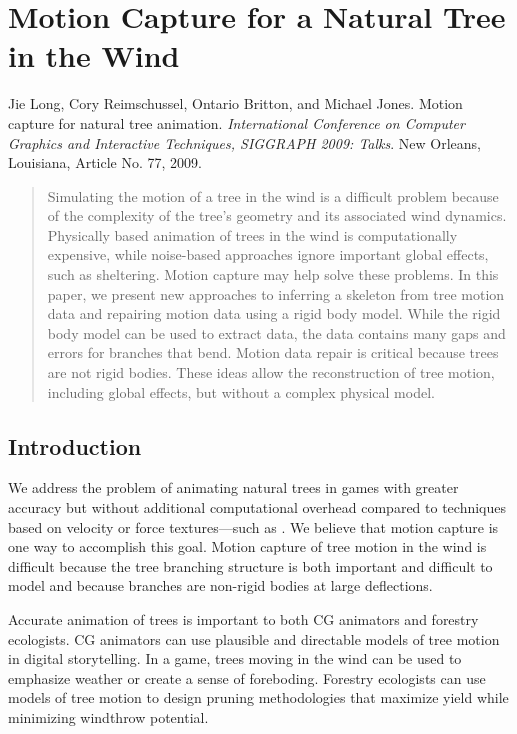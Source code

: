 \chapter{Motion Capture for a Natural Tree in the Wind} 
\label{chap:pilottree}

\noindent
Jie Long, Cory Reimschussel, Ontario Britton, and Michael Jones. Motion capture for natural tree animation. \emph{International Conference on Computer Graphics and Interactive Techniques, SIGGRAPH 2009: Talks}. New Orleans, Louisiana, Article No. 77, 2009.

\begin{abstract}
Simulating the motion of a tree in the wind is a difficult problem because of the complexity of the tree's geometry and its associated wind dynamics. Physically based animation of trees in the wind is computationally expensive, while noise-based approaches ignore important global effects, such as sheltering. Motion capture may help solve these problems. In this paper, we present new approaches to inferring a skeleton from tree motion data and repairing motion data using a rigid body model. While the rigid body model can be used to extract data, the data contains many gaps and errors for branches that bend. Motion data repair is critical because trees are not rigid bodies. These ideas allow the reconstruction of tree motion, including global effects, but without a complex physical model.
\end{abstract}

\section{Introduction}

We address the problem of animating natural trees in games with greater accuracy but without additional computational overhead compared to techniques based on velocity or force textures---such as \cite{Habel09PGT}. We believe that motion capture is one way to accomplish this goal. Motion capture of tree motion in the wind is difficult because the tree branching structure is both important and difficult to model and because branches are non-rigid bodies at large deflections.   

Accurate animation of trees is important to both CG animators and forestry ecologists. CG animators can use plausible and directable models of tree motion in digital storytelling.  In a game, trees moving in the wind can be used to emphasize weather or create a sense of foreboding. Forestry ecologists can use models of tree motion to design pruning methodologies that maximize yield while minimizing windthrow potential. 

